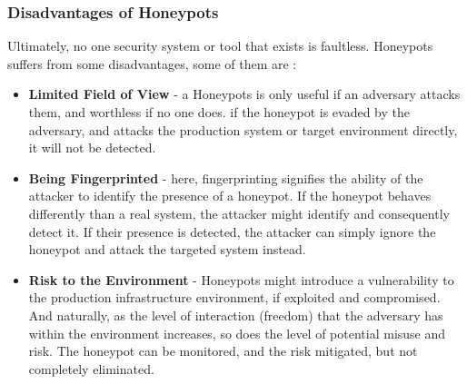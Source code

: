 \documentclass[grad,lot,lof,11pt,oneside,onehalfspace]{RUthesis}
\begin{document}
\subsubsection{Disadvantages of Honeypots}
Ultimately, no one security system or tool that exists is faultless. Honeypots suffers from some disadvantages,  some of them are \cite{nawrocki_survey_2016}:
\begin{itemize}
	\item{\textbf{Limited Field of View} -}
	a Honeypots is only useful if an adversary attacks them, and worthless if no one does.  if the honeypot is evaded by the adversary, and attacks the production system or target environment directly, it will not be detected.  
	\item{\textbf{Being Fingerprinted} -}  
	here, fingerprinting signifies the ability of the attacker to identify the presence of a honeypot. If the honeypot behaves differently than a real system, the attacker might identify and consequently detect it. If their presence is detected, the attacker can simply ignore the honeypot and attack the targeted  system instead. 
	\item{\textbf{Risk to the Environment} -}
	Honeypots might introduce a vulnerability to the production infrastructure environment, if exploited and compromised. And naturally, as the level of interaction (freedom) that the adversary has within the environment increases, so does the level of potential misuse and risk. The honeypot can be monitored, and the risk mitigated, but not completely eliminated.  
\end{itemize}
\end{document}
